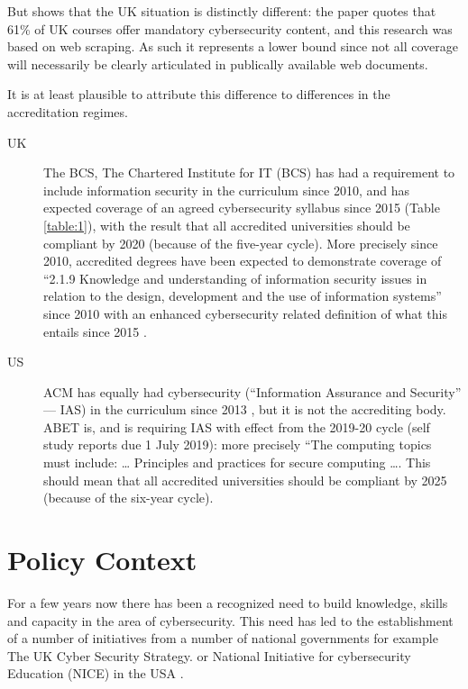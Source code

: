 \documentclass[conference]{IEEEtran}
\begin{document}
But \cite[Table 1]{Ruiz2019a} shows that the UK situation is distinctly different: the paper quotes that 61\% of UK courses offer mandatory cybersecurity content, and this research was based on web scraping. As such it represents a lower bound since not all coverage will necessarily be clearly articulated in publically available web documents.

It is at least plausible to attribute this difference to differences in the accreditation regimes.
\begin{description}
\item[UK]The BCS, The Chartered Institute for IT (BCS) has had a requirement to include information security in the curriculum since 2010, and has expected coverage of an agreed cybersecurity syllabus since 2015 (Table \ref{table:1}), with the result that all accredited universities should be compliant by 2020 (because of the five-year cycle). More precisely since 2010, accredited degrees have been expected to demonstrate coverage of ``2.1.9 Knowledge and understanding of information security issues in relation to the design, development and the use of information  systems'' \cite[p.~30]{BCS2018a} since 2010 with an enhanced cybersecurity related definition of what this entails since 2015 \cite[p.~17--18]{BCS2018a}.
\item[US]ACM has equally had cybersecurity (``Information Assurance and Security'' --- IAS) in the curriculum since 2013 \cite{ACM2013a}, but it is not the accrediting body. ABET is, and is requiring IAS with effect from the 2019-20 cycle (self study reports due 1 July 2019): more precisely \cite[Table 3]{Oudshoornetal2018a} ``The computing topics must include: \dots{} Principles and practices for secure computing \dots. This should mean that  all accredited universities should be compliant by 2025 (because of the six-year cycle).
\end{description}
\section{Policy Context}

For a few years now there has been a recognized need to build knowledge, skills and capacity in the area of cybersecurity. This need has led to the establishment of a number of initiatives from a number of national governments for example The UK Cyber Security Strategy. \cite{UKCabinetOffice} or National Initiative for cybersecurity Education (NICE) in the USA \cite{NICE}. 
\end{document}
